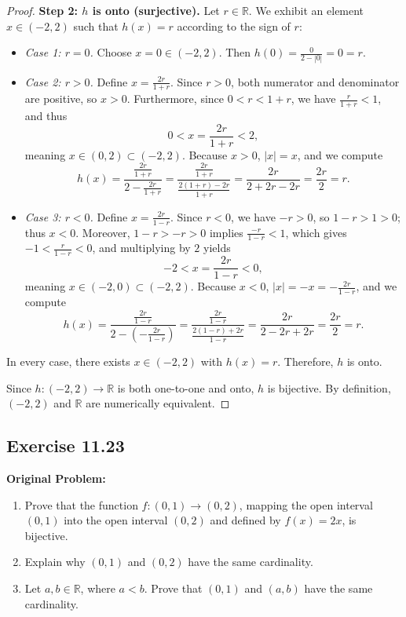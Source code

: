 \documentclass[11pt, letterpaper]{article}
\theoremstyle{definition}
\theoremstyle{remark}
\begin{document}
\begin{proof}
\textbf{Step 2: $h$ is onto (surjective).}
Let $r \in \mathbb{R}$. We exhibit an element $x \in (-2, 2)$ such that $h(x) = r$ according to the sign of $r$:
\begin{itemize}
    \item \emph{Case 1: $r = 0$.} Choose $x = 0 \in (-2, 2)$. Then $h(0) = \frac{0}{2 - |0|} = 0 = r$.
    \item \emph{Case 2: $r > 0$.} Define $x = \frac{2r}{1 + r}$. Since $r > 0$, both numerator and denominator are positive, so $x > 0$. Furthermore, since $0 < r < 1 + r$, we have $\frac{r}{1 + r} < 1$, and thus
    \[
    0 < x = \frac{2r}{1 + r} < 2,
    \]
    meaning $x \in (0, 2) \subset (-2, 2)$. Because $x > 0$, $|x| = x$, and we compute
    \[
    h(x) = \frac{\frac{2r}{1 + r}}{2 - \frac{2r}{1 + r}} = \frac{\frac{2r}{1 + r}}{\frac{2(1 + r) - 2r}{1 + r}} = \frac{2r}{2 + 2r - 2r} = \frac{2r}{2} = r.
    \]
    \item \emph{Case 3: $r < 0$.} Define $x = \frac{2r}{1 - r}$. Since $r < 0$, we have $-r > 0$, so $1 - r > 1 > 0$; thus $x < 0$. Moreover, $1 - r > -r > 0$ implies $\frac{-r}{1 - r} < 1$, which gives $-1 < \frac{r}{1 - r} < 0$, and multiplying by $2$ yields
    \[
    -2 < x = \frac{2r}{1 - r} < 0,
    \]
    meaning $x \in (-2, 0) \subset (-2, 2)$. Because $x < 0$, $|x| = -x = -\frac{2r}{1 - r}$, and we compute
    \[
    h(x) = \frac{\frac{2r}{1 - r}}{2 - \left(-\frac{2r}{1 - r}\right)} = \frac{\frac{2r}{1 - r}}{\frac{2(1 - r) + 2r}{1 - r}} = \frac{2r}{2 - 2r + 2r} = \frac{2r}{2} = r.
    \]
\end{itemize}
In every case, there exists $x \in (-2, 2)$ with $h(x) = r$. Therefore, $h$ is onto.

Since $h : (-2, 2) \to \mathbb{R}$ is both one-to-one and onto, $h$ is bijective. By definition, $(-2, 2)$ and $\mathbb{R}$ are numerically equivalent.
\end{proof}

\subsection{Exercise 11.23}

\textbf{Original Problem:}
\begin{enumerate}[label=(\alph*)]
    \item Prove that the function $f : (0, 1) \to (0, 2)$, mapping the open interval $(0, 1)$ into the open interval $(0, 2)$ and defined by $f(x) = 2x$, is bijective.
    \item Explain why $(0, 1)$ and $(0, 2)$ have the same cardinality.
    \item Let $a, b \in \mathbb{R}$, where $a < b$. Prove that $(0, 1)$ and $(a, b)$ have the same cardinality.
\end{enumerate}
\end{document}
